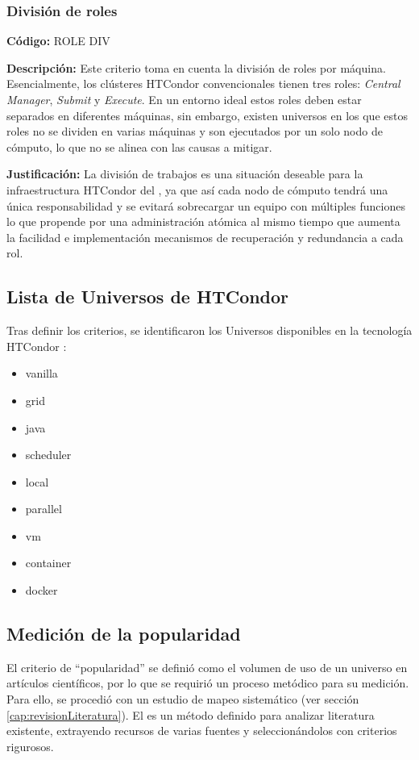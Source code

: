 \subsubsection{División de roles}
\textbf{Código:} ROLE DIV

\textbf{Descripción:} Este criterio toma en cuenta la división de roles por máquina.
Esencialmente, los clústeres HTCondor convencionales tienen tres roles: \textit{Central
	Manager}, \textit{Submit } y \textit{Execute}. En un entorno ideal estos roles deben estar
separados en diferentes máquinas, sin embargo, existen universos en los que
estos roles no se dividen en varias máquinas y son ejecutados por un solo nodo
de cómputo, lo que no se alinea con las causas a mitigar.

\textbf{Justificación:} La división de trabajos es una situación deseable para la
infraestructura HTCondor del \GRID, ya que así cada nodo de cómputo tendrá una
única responsabilidad y se evitará sobrecargar un equipo con múltiples funciones
lo que propende por una administración atómica al mismo tiempo que aumenta la
facilidad e implementación mecanismos de recuperación y redundancia a cada
rol.



\subsection{Lista de Universos de HTCondor}
Tras definir los criterios, se identificaron los Universos disponibles en la tecnología HTCondor \citep{HTCondor-choosing-universe}:
\begin{itemize}
	\item vanilla
	\item grid
	\item java
	\item scheduler
	\item local
	\item parallel
	\item vm
	\item container
	\item docker
\end{itemize}

\subsection{Medición de la popularidad}
El criterio de ``popularidad'' se definió como el volumen de uso de un universo en artículos científicos, por lo que se requirió un proceso metódico para su medición. Para ello, se procedió con un estudio de mapeo sistemático \SMS (ver sección \ref{cap:revisionLiteratura}). El \SMS es un método definido para analizar literatura existente, extrayendo recursos de varias fuentes y seleccionándolos con criterios rigurosos.

